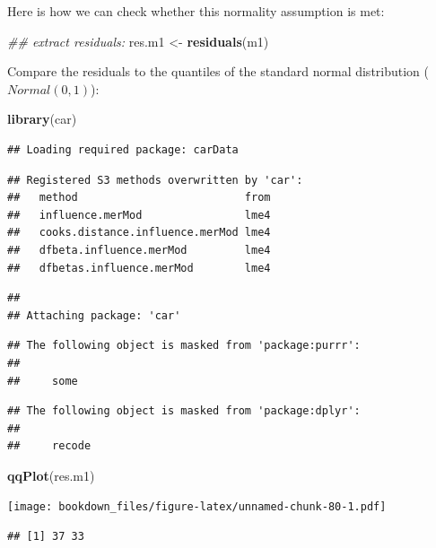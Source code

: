 \documentclass[12pt,]{krantz}
\newenvironment{Shaded}{\begin{snugshade}}{\end{snugshade}}
\newcommand{\CommentTok}[1]{\textcolor[rgb]{0.56,0.35,0.01}{\textit{#1}}}
\newcommand{\KeywordTok}[1]{\textcolor[rgb]{0.13,0.29,0.53}{\textbf{#1}}}
\newcommand{\NormalTok}[1]{#1}
\newcommand{\StringTok}[1]{\textcolor[rgb]{0.31,0.60,0.02}{#1}}
\begin{document}
Here is how we can check whether this normality assumption is met:

\begin{Shaded}
\begin{Highlighting}[]
\CommentTok{## extract residuals:}
\NormalTok{res.m1 <-}\StringTok{ }\KeywordTok{residuals}\NormalTok{(m1)}
\end{Highlighting}
\end{Shaded}

Compare the residuals to the quantiles of the standard normal distribution (\(Normal(0,1)\)):

\begin{Shaded}
\begin{Highlighting}[]
\KeywordTok{library}\NormalTok{(car)}
\end{Highlighting}
\end{Shaded}

\begin{verbatim}
## Loading required package: carData
\end{verbatim}

\begin{verbatim}
## Registered S3 methods overwritten by 'car':
##   method                          from
##   influence.merMod                lme4
##   cooks.distance.influence.merMod lme4
##   dfbeta.influence.merMod         lme4
##   dfbetas.influence.merMod        lme4
\end{verbatim}

\begin{verbatim}
## 
## Attaching package: 'car'
\end{verbatim}

\begin{verbatim}
## The following object is masked from 'package:purrr':
## 
##     some
\end{verbatim}

\begin{verbatim}
## The following object is masked from 'package:dplyr':
## 
##     recode
\end{verbatim}

\begin{Shaded}
\begin{Highlighting}[]
\KeywordTok{qqPlot}\NormalTok{(res.m1)}
\end{Highlighting}
\end{Shaded}

\texttt{[image: bookdown\_files/figure-latex/unnamed-chunk-80-1.pdf]}

\begin{verbatim}
## [1] 37 33
\end{verbatim}
\end{document}
